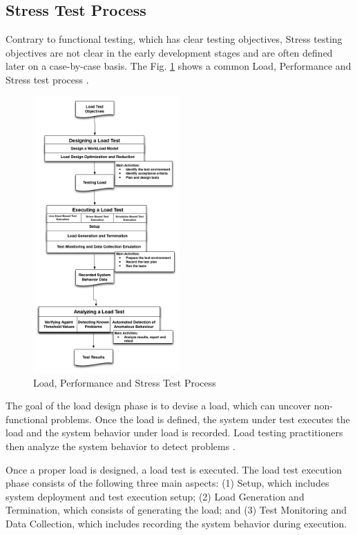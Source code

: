 \subsection{Stress Test Process}

Contrary to functional testing, which has clear testing objectives, Stress testing objectives are not clear in the early development stages and are often defined later on a case-by-case basis. The Fig. \ref{fig:testprocess} shows a common Load, Performance and Stress test process  \cite{Jiang2010}.

\begin{figure}[!ht]
\centering
\includegraphics[width=0.5\textwidth]{./images/testprocess.png}
\caption{Load, Performance and Stress Test Process \cite{Jiang2010}\cite{Erinle2013}}
\label{fig:testprocess}
\end{figure}


The goal of the load design phase is to devise a load, which can uncover non-functional problems. Once the load is defined, the system under test executes the load and the system behavior under load is recorded. Load testing practitioners then analyze the system behavior to detect problems \cite{Jiang2010}. 

Once a proper load is designed, a load test is executed. The load test execution phase consists of the following three main aspects: (1) Setup, which includes system deployment and test execution setup; (2) Load Generation and Termination, which consists of generating the load; and (3) Test Monitoring and Data Collection, which includes recording the system behavior during execution\cite{Jiang2010}. 

